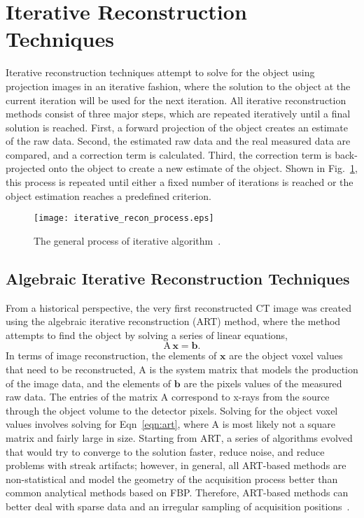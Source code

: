 \section{Iterative Reconstruction Techniques}
Iterative reconstruction techniques attempt to solve for the object using projection images in an iterative fashion, where the solution to the object at the current iteration will be used for the next iteration.  All iterative reconstruction methods consist of three major steps, which are repeated iteratively until a final solution is reached.  First, a forward projection of the object creates an estimate of the raw data.  Second, the estimated raw data and the real measured data are compared, and a correction term is calculated.  Third, the correction term is back-projected onto the object to create a new estimate of the object.  Shown in Fig.~\ref{fig:generalIR}, this process is repeated until either a fixed number of iterations is reached or the object estimation reaches a predefined criterion.
%
\begin{figure}
\centering
\texttt{[image: iterative\_recon\_process.eps]}
\caption{The general process of iterative algorithm~\citep{Beister2012}.}
\label{fig:generalIR}
\end{figure}

\subsection{Algebraic Iterative Reconstruction Techniques}
From a historical perspective, the very first reconstructed CT image was created using the algebraic iterative reconstruction (ART) method, where the method attempts to find the object by solving a series of linear equations,
%
\begin{equation}
\mathrm{A\,\mathbf{x} = \mathbf{b}}.
\label{eqn:art}
\end{equation}
%
In terms of image reconstruction, the elements of $\mathrm{\mathbf{x}}$ are the object voxel values that need to be reconstructed, $\mathrm{A}$ is the system matrix that models the production of the image data, and the elements of $\mathrm{\mathbf{b}}$ are the pixels values of the measured raw data.  The entries of the matrix $\mathrm{A}$ correspond to x-rays from the source through the object volume to the detector pixels.  Solving for the object voxel values involves solving for Eqn~\ref{eqn:art}, where $\mathrm{A}$ is most likely not a square matrix and fairly large in size.  Starting from ART, a series of algorithms evolved that would try to converge to the solution faster, reduce noise, and reduce problems with streak artifacts; however, in general, all ART-based methods are non-statistical and model the geometry of the acquisition process better than common analytical methods based on FBP.  Therefore, ART-based methods can better deal with sparse data and an irregular sampling of acquisition positions~\citep{Beister2012}.

